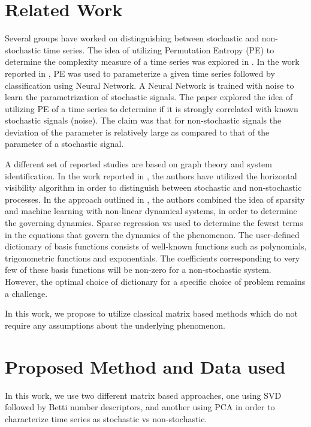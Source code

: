 \documentclass[10pt,conference]{IEEEtran}
\begin{document}
\section{Related Work}
Several groups have worked on distinguishing between stochastic and non-stochastic time series. The idea of utilizing Permutation Entropy (PE) to determine the complexity measure of a time series was explored in \cite{Bandt2002}. In the work reported in \cite{Boaretto2021}, PE was used to parameterize a given time series  followed by classification using  Neural Network. A Neural Network is trained with noise to learn the parametrization of stochastic signals. The paper explored the idea of utilizing PE of a time series to determine if it is strongly correlated with known stochastic signals (noise).   The claim was that for non-stochastic signals the deviation of the parameter is relatively large as compared to that of the parameter of a stochastic signal.

A different set of reported studies are based on  graph theory and system identification. In the work reported in \cite{lacasa2010}, the authors have utilized the horizontal visibility algorithm in order to distinguish between stochastic and non-stochastic processes. In the approach outlined in \cite{Brunton2016}, the authors combined the idea of sparsity and machine learning with non-linear dynamical systems, in order to determine the governing dynamics. Sparse regression ws used to determine the fewest terms in the equations that govern the dynamics of the phenomenon. The user-defined dictionary of basis functions consists of well-known functions such as polynomials, trigonometric functions and exponentials. The coefficients corresponding to very few of these basis functions will be non-zero for a non-stochastic system. However, the optimal choice of dictionary for a specific choice of problem remains a challenge.

In this work, we propose to utilize classical matrix based methods which do not require any assumptions about the underlying phenomenon.

\section{Proposed Method and Data used}

In this work, we use two different matrix based approaches, one using SVD followed by  Betti number descriptors, and  another using PCA in order to characterize time series as stochastic vs non-stochastic.
\end{document}
